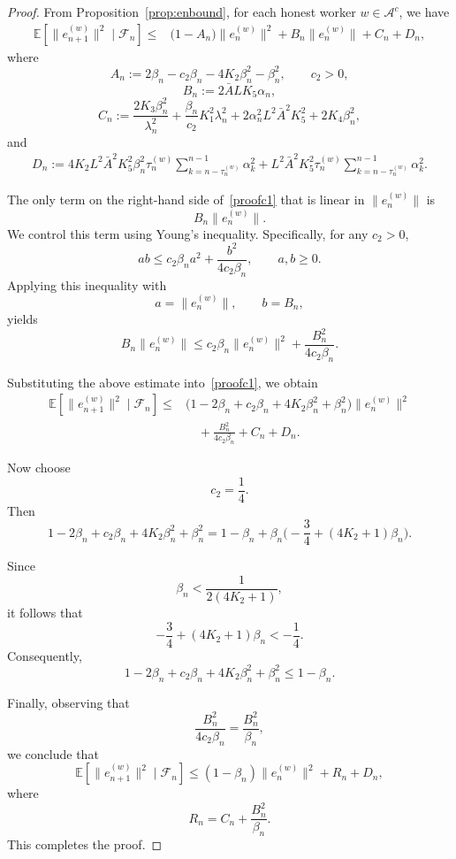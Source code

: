 \documentclass{article}
\begin{document}
\begin{proof}
From Proposition~\ref{prop:enbound}, for each honest worker
$w \in \mathcal{A}^c$, we have
\begin{equation}
\begin{split}
\mathbb{E}\!\left[
\|e_{n+1}^{(w)}\|^2
\mid
\mathcal{F}_n
\right]
\le{}&
\big(1-A_n\big)\|e_n^{(w)}\|^2
+
B_n \|e_n^{(w)}\|
+
C_n
+
D_n ,
\end{split}
\label{proofc1}
\end{equation}
where
\[
A_n
:=
2\beta_n
-
c_2\beta_n
-
4K_2\beta_n^2
-
\beta_n^2,
\qquad c_2>0,
\]
\[
B_n
:=
2\bar{A} L K_5 \alpha_n,
\]
\[
C_n
:=
\frac{2K_3\beta_n^2}{\lambda_n^2}
+
\frac{\beta_n}{c_2}K_1^2\lambda_n^2
+
2\alpha_n^2 L^2 \bar{A}^2 K_5^2
+
2K_4\beta_n^2,
\]
and
\[
\begin{aligned}
D_n
:={}
4K_2L^2\bar{A}^2K_5^2
\beta_n^2
\tau_n^{(w)}
\sum_{k=n-\tau_n^{(w)}}^{n-1}
\alpha_k^2
+
L^2\bar{A}^2K_5^2
\tau_n^{(w)}
\sum_{k=n-\tau_n^{(w)}}^{n-1}
\alpha_k^2 .
\end{aligned}
\]

The only term on the right-hand side of~\eqref{proofc1} that is linear in
$\|e_n^{(w)}\|$ is
\[
B_n \|e_n^{(w)}\|.
\]
We control this term using Young's inequality. Specifically, for any $c_2>0$,
\[
ab
\le
c_2\beta_n a^2
+
\frac{b^2}{4c_2\beta_n},
\qquad
a,b \ge 0.
\]
Applying this inequality with
\[
a=\|e_n^{(w)}\|,
\qquad
b=B_n,
\]
yields
\[
B_n \|e_n^{(w)}\|
\le
c_2\beta_n \|e_n^{(w)}\|^2
+
\frac{B_n^2}{4c_2\beta_n}.
\]

Substituting the above estimate into~\eqref{proofc1}, we obtain
\begin{equation*}
\begin{split}
\mathbb{E}\!\left[
\|e_{n+1}^{(w)}\|^2
\mid
\mathcal{F}_n
\right]
\le{}&
\Big(
1
-
2\beta_n
+
c_2\beta_n
+
4K_2\beta_n^2
+
\beta_n^2
\Big)
\|e_n^{(w)}\|^2
\\
&\quad
+
\frac{B_n^2}{4c_2\beta_n}
+
C_n
+
D_n .
\end{split}
\end{equation*}

Now choose
\[
c_2=\frac14.
\]
Then
\[
1
-
2\beta_n
+
c_2\beta_n
+
4K_2\beta_n^2
+
\beta_n^2
=
1
-
\beta_n
+
\beta_n
\Big(
-\frac34
+
(4K_2+1)\beta_n
\Big).
\]

Since
\[
\beta_n
<
\frac{1}{2(4K_2+1)},
\]
it follows that
\[
-\frac34
+
(4K_2+1)\beta_n
<
-\frac14.
\]
Consequently,
\[
1
-
2\beta_n
+
c_2\beta_n
+
4K_2\beta_n^2
+
\beta_n^2
\le
1-\beta_n.
\]

Finally, observing that
\[
\frac{B_n^2}{4c_2\beta_n}
=
\frac{B_n^2}{\beta_n},
\]
we conclude that
\[
\mathbb{E}\!\left[
\|e_{n+1}^{(w)}\|^2
\mid
\mathcal{F}_n
\right]
\le
(1-\beta_n)\|e_n^{(w)}\|^2
+
R_n
+
D_n,
\]
where
\[
R_n
=
C_n
+
\frac{B_n^2}{\beta_n}.
\]
This completes the proof.
\end{proof}
\end{document}
